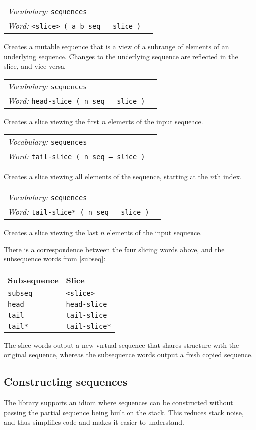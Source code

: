 \documentclass{book}
\newcommand{\vocabulary}[1]{\emph{Vocabulary:} \texttt{#1}&\\}
\newcommand{\ordinaryword}[2]{\index{\texttt{#1}}\emph{Word:} \texttt{#2}&\\}
\newcommand{\wordtable}[1]{


\begin{tabularx}{12cm}{lX}
\hline
#1
\hline
\end{tabularx}

}
\begin{document}
\wordtable{
\vocabulary{sequences}
\ordinaryword{<slice>}{<slice> ( a b seq -- slice )}
}
Creates a mutable sequence that is a view of a subrange of elements of an underlying sequence. Changes to the underlying sequence are reflected in the slice, and vice versa.
\wordtable{
\vocabulary{sequences}
\ordinaryword{head-slice}{head-slice ( n seq -- slice )}
}
Creates a slice viewing the first $n$ elements of the input sequence.
\wordtable{
\vocabulary{sequences}
\ordinaryword{tail-slice}{tail-slice ( n seq -- slice )}
}
Creates a slice viewing all elements of the sequence, starting at the $n$th index.

\wordtable{
\vocabulary{sequences}
\ordinaryword{tail-slice*}{tail-slice* ( n seq -- slice )}
}
Creates a slice viewing the last $n$ elements of the input sequence.

There is a correspondence between the four slicing words above, and the subsequence words from \ref{subseq}:

\begin{tabular}[t]{l|l}
Subsequence&Slice\\
\hline
\verb|subseq|&\verb|<slice>|\\
\verb|head|&\verb|head-slice|\\
\verb|tail|&\verb|tail-slice|\\
\verb|tail*|&\verb|tail-slice*|
\end{tabular}

The slice words output a new virtual sequence that shares structure with the original sequence, whereas the subsequence words output a fresh copied sequence.

\subsection{Constructing sequences}\label{make-seq}

The library supports an idiom where sequences can be constructed without passing the partial sequence being built on the stack. This reduces stack noise, and thus simplifies code and makes it easier to understand.
\end{document}
